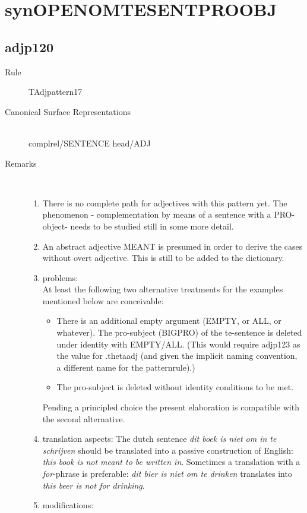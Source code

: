 \section{synOPENOMTESENTPROOBJ}
\subsection{adjp120}
\begin{description}
  \item [Rule] TAdjpattern17
  \item [Canonical Surface Representations]\mbox{}\\  complrel/SENTENCE head/ADJ

  \item [Remarks] \mbox{}\\  
\begin{enumerate}
\item There is no complete path for adjectives with this pattern yet. 
The phenomenon - complementation by means of a sentence with a PRO-object- 
needs to be 
studied still in some more detail. 
\item An abstract adjective MEANT is presumed in order to derive the cases 
without overt adjective. This is still to be added to the dictionary. 
\item problems:\\
At least the following 
two alternative treatments for the examples mentioned below are 
conceivable:
\begin{itemize}
  \item There is an additional empty argument (EMPTY,  or ALL, or whatever).
The pro-subject (BIGPRO) of the te-sentence is deleted 
under identity with EMPTY/ALL. 
(This would require adjp123 as the value for .thetaadj (and given the implicit 
naming convention, a different name for the patternrule).) 
  \item
The pro-subject is deleted without identity conditions to be met.
\end{itemize}
Pending a principled choice the present elaboration is compatible 
with the second alternative.

\item translation aspects: The dutch sentence 
{\em dit boek is niet om in te schrijven} should be 
translated into a passive construction of English: {\em this book is not meant 
to be
written in}. Sometimes a translation with a {\em for}-phrase is preferable:
{\em dit bier is niet om te drinken} translates into {\em this beer is not for 
drinking}. 
\item modifications:\\


\end{enumerate}
\end{description}
